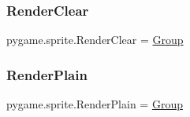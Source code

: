 \subsubsection{\texorpdfstring{Render\+Clear}{RenderClear}}
{\footnotesize\ttfamily pygame.\+sprite.\+Render\+Clear = \hyperlink{classpygame_1_1sprite_1_1_group}{Group}}

\mbox{\label{namespacepygame_1_1sprite_a3e060a482e09d1a567cb7356c2cf4a33}} 
\subsubsection{\texorpdfstring{Render\+Plain}{RenderPlain}}
{\footnotesize\ttfamily pygame.\+sprite.\+Render\+Plain = \hyperlink{classpygame_1_1sprite_1_1_group}{Group}}

